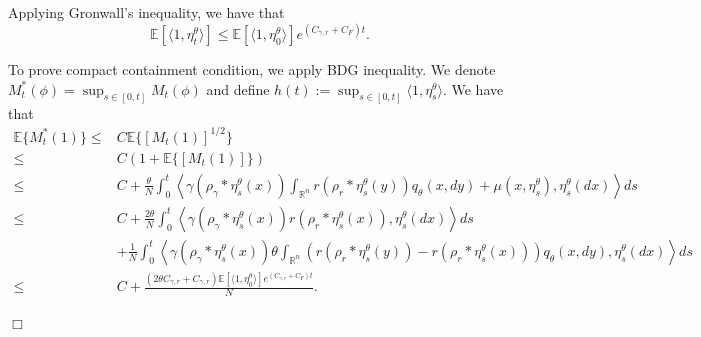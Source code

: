 \documentclass[12pt]{article}
\newenvironment {proof}{{\noindent\bf Proof }}{\hfill $\Box$ \medskip}
\begin{document}
\begin{proof}
Applying Gronwall's inequality, we have that 
\begin{equation}
 \mathbb{E}[\langle 1 ,\eta^{\theta}_{t}\rangle] \leq \mathbb{E}[\langle 1 ,\eta^{\theta}_{0}\rangle]e^{(C_{\gamma,r}+C_F)t}.   
\end{equation}

To prove compact containment condition, we apply BDG inequality.
We denote $M^{*}_t(\phi)=\sup_{s \in [0,t]}M_t(\phi)$
and define $h(t):=\sup_{s \in [0,t]}\langle 1, \eta^{\theta}_{s} \rangle$.
We have that
\begin{equation}\label{eq: Control quadratic variation}
\begin{aligned}
\mathbb{E}\{M^{*}_t(1)\} \leq & C \mathbb{E}\{[M_t(1)]^{1/2}\}\\
\leq& C (1+\mathbb{E}\{[M_t(1)]\})\\
\leq & C+\frac{\theta}{N}\int_{0}^{t} \left\langle \gamma(\rho_{\gamma}*\eta^{\theta}_{s}(x))\int_{\mathbb{R}^n}r(\rho_{r}*\eta^{\theta}_{s}(y)) q_\theta(x,dy)+\mu(x,\eta^{\theta}_{s}), \eta^{\theta}_{s}(dx) \right\rangle ds \\
\leq & C+\frac{2\theta}{N}\int_{0}^{t} \left\langle \gamma(\rho_{\gamma}*\eta^{\theta}_{s}(x))r(\rho_{r}*\eta^{\theta}_{s}(x)), \eta^{\theta}_{s}(dx) \right\rangle ds \\
& + \frac{1}{N}\int_{0}^{t} \left\langle \gamma (\rho_{\gamma}*\eta^{\theta}_{s}(x))\theta\int_{\mathbb{R}^n}\left(r(\rho_{r}*\eta^{\theta}_{s}(y))-r(\rho_{r}*\eta^{\theta}_{s}(x))\right) q_\theta(x,dy), \eta^{\theta}_{s}(dx) \right\rangle ds\\
\leq & C+ \frac{(2 \theta C_{\gamma,r}+C_{\gamma,r})\mathbb{E}[\langle 1 ,\eta^{\theta}_{0}\rangle]e^{(C_{\gamma,r}+C_F)t}}{N}.
\end{aligned}
\end{equation}


\end{proof}
\end{document}
